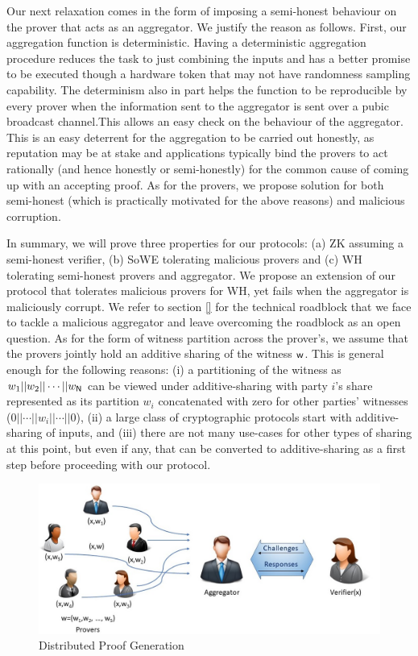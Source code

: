  Our next relaxation comes in the form of imposing a semi-honest behaviour on the prover that acts as an aggregator. We justify the reason as follows.  First,  our aggregation function is deterministic. Having  a deterministic aggregation procedure reduces the task to just combining the inputs and has a better promise to be executed though a hardware token that may not have randomness sampling capability.  The determinism also in part helps the function to be reproducible by every prover  when the information sent to the aggregator is sent over a pubic broadcast channel.This allows an easy check  on the behaviour of the aggregator. This is an easy deterrent for the aggregation to be carried out honestly, as reputation may be at stake and applications typically bind the provers to act rationally (and hence honestly or semi-honestly) for the common cause of coming up with an accepting proof.  As for the provers, we  propose solution for both semi-honest (which is practically motivated for the above reasons) and malicious corruption. 


In summary,  we will prove three properties for our protocols: (a) ZK assuming a semi-honest verifier, (b)  SoWE tolerating  malicious provers and (c) WH tolerating semi-honest provers and aggregator. We propose an extension of our protocol that tolerates malicious provers for WH, yet fails when the aggregator is maliciously corrupt. We refer to section \ref{}  for the technical roadblock that we face to tackle a malicious aggregator and leave overcoming the roadblock as an open question.    As for the form of witness partition across the prover's, we assume that the provers jointly hold an additive sharing of the witness $\mathsf{w}$. This is general enough for the following reasons: (i) a partitioning of the witness as $w_1 || w_2 || \cdots || w_{\mathsf{N}}$ can be viewed under additive-sharing with party $i$'s share represented as its partition $w_i$ concatenated with zero for other parties' witnesses ($0 || \cdots || w_i || \cdots || 0$), (ii) a large class of cryptographic protocols start with additive-sharing of inputs, and (iii) there are not many use-cases for other types of sharing at this point, but even if any, that can be converted to additive-sharing as a first step before proceeding with our protocol.

\begin{figure}[h!]
	\centering	
	\includegraphics[width=0.9\linewidth]{DPZK.jpg}
	\caption{Distributed Proof Generation}
	\label{fig:DPZK}
\end{figure}

